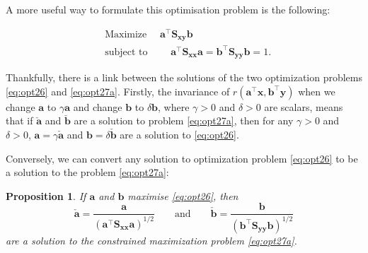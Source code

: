 \documentclass[]{book}
\newtheorem{proposition}{Proposition}[chapter]
\theoremstyle{definition}
\theoremstyle{definition}
\theoremstyle{definition}
\theoremstyle{remark}
\begin{document}
A more useful way to formulate this optimisation problem is the following:

\begin{align}
&\mbox{Maximize }\quad \boldsymbol a^\top \boldsymbol S_{\boldsymbol x\boldsymbol y}\boldsymbol b
\label{eq:opt27a}\\
  &\mbox{subject to } \qquad  \boldsymbol a^\top \boldsymbol S_{\boldsymbol x\boldsymbol x}\boldsymbol a=\boldsymbol b^\top \boldsymbol S_{\boldsymbol y\boldsymbol y}\boldsymbol b=1.\nonumber
\end{align}

Thankfully, there is a link between the solutions of the two optimization problems \eqref{eq:opt26} and \eqref{eq:opt27a}. Firstly, the invariance of \(r(\boldsymbol a^\top \boldsymbol x, \boldsymbol b^\top \boldsymbol y)\) when we
change \(\boldsymbol a\) to \(\gamma \boldsymbol a\) and change \(\boldsymbol b\) to \(\delta \boldsymbol b\), where \(\gamma>0\) and \(\delta>0\) are scalars, means that if
\(\check{\boldsymbol a}\) and \(\check{\boldsymbol b}\) are a solution to problem \eqref{eq:opt27a}, then for any \(\gamma>0\) and \(\delta>0\), \(\boldsymbol a=\gamma \check{\boldsymbol a}\) and \(\boldsymbol b=\delta \check{\boldsymbol b}\) are a solution to \eqref{eq:opt26}.

Conversely, we can convert any solution to optimization problem \eqref{eq:opt26} to be a solution to the problem \eqref{eq:opt27a}:

\begin{proposition}
\protect\hypertarget{prp:unnamed-chunk-1}{}{\label{prp:unnamed-chunk-1} }If \(\boldsymbol a\) and \(\boldsymbol b\) maximise \eqref{eq:opt26}, then
\[
\check{\boldsymbol a}=\frac{\boldsymbol a}{(\boldsymbol a^\top \boldsymbol S_{\boldsymbol x\boldsymbol x}{\boldsymbol a})^{1/2}} \qquad \text{and} \qquad
\check{\boldsymbol b}= \frac{{\boldsymbol b}}{({\boldsymbol b}^\top \boldsymbol S_{\boldsymbol y\boldsymbol y}{\boldsymbol b})^{1/2}}
\]
are a solution to the constrained maximization problem \eqref{eq:opt27a}.
\end{proposition}
\end{document}
